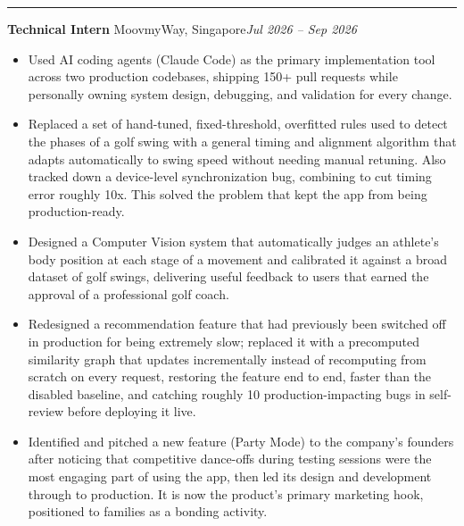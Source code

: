 \documentclass[11pt]{article}
\newcommand{\cvsection}[1]{%
  \vspace{10pt}%
  \noindent{\large\bfseries\MakeUppercase{#1}}\par
  \vspace{-4pt}\noindent\rule{\linewidth}{0.7pt}\vspace{4pt}%
}
\begin{document}
\cvsection{Experience}
\noindent\textbf{Technical Intern} MoovmyWay, Singapore\hfill\textit{Jul 2026 -- Sep 2026}\par
\begin{itemize}
  \item Used AI coding agents (Claude Code) as the primary implementation tool across two production codebases, shipping 150+ pull requests while personally owning system design, debugging, and validation for every change.
  \item Replaced a set of hand-tuned, fixed-threshold, overfitted rules used to detect the phases of a golf swing with a general timing and alignment algorithm that adapts automatically to swing speed without needing manual retuning. Also tracked down a device-level synchronization bug, combining to cut timing error roughly 10x. This solved the problem that kept the app from being production-ready.
  \item Designed a Computer Vision system that automatically judges an athlete's body position at each stage of a movement and calibrated it against a broad dataset of golf swings, delivering useful feedback to users that earned the approval of a professional golf coach.
  \item Redesigned a recommendation feature that had previously been switched off in production for being extremely slow; replaced it with a precomputed similarity graph that updates incrementally instead of recomputing from scratch on every request, restoring the feature end to end, faster than the disabled baseline, and catching roughly 10 production-impacting bugs in self-review before deploying it live.
  \item Identified and pitched a new feature (Party Mode) to the company's founders after noticing that competitive dance-offs during testing sessions were the most engaging part of using the app, then led its design and development through to production. It is now the product's primary marketing hook, positioned to families as a bonding activity.
\end{itemize}
\end{document}
